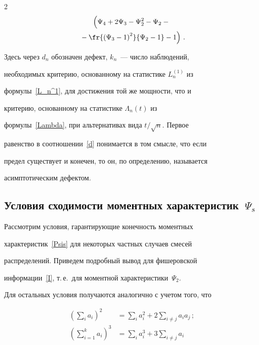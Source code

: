 \begin{multicols}{2}
\begin{multline}
\left(\vphantom{\fr{\left(\Psi_3-1\right)^2}{\Psi_2-1}}

\Psi_4+2\Psi_3-\Psi^2_2-\Psi_2-{}\right.\\

\left.{}-\fr{\left(\Psi_3-1\right)^2}{\Psi_2-1}-1\right)\,.

\label{d}

\end{multline}

Здесь через $d_n$ обозначен дефект, $k_n$~--- число наблюдений,

необходимых критерию, основанному на статистике $L_n^{(1)}$ из

формулы~\eqref{L_n^1}, для достижения той же мощности, что и

критерию, основанному на статистике $\Lambda_n(t)$ из

формулы~\eqref{Lambda}, при альтернативах вида $t/\sqrt{n}$. Первое

равенство в соотношении~\eqref{d} понимается в том смысле, что если

предел существует и конечен, то он, по определению, называется

асимптотическим дефектом.



\subsection{Условия сходимости моментных характеристик~$\Psi_s$}



Рассмотрим условия, гарантирующие конеч\-ность моментных

характеристик~\eqref{Psis} для не\-ко\-торых частных случаев смесей

распределений. Приведем подробный вывод для фишеровской\linebreak

информации~\eqref{I}, т.\,е.\ для моментной характеристики~$\Psi_2$.

Для остальных условия получаются аналогично с учетом того, что

\begin{align*}

\left(\sum\limits_i a_i\right)^2&=\sum\limits_i

a_i^2+2\sum\limits_{i\neq j} a_i a_j\,;\\

\left(\sum\limits_{i=1}^k

a_i\right)^3&=\sum\limits_i a_i^3+3\sum\limits_{i\neq j} a_i


\end{align*}
\end{multicols}
